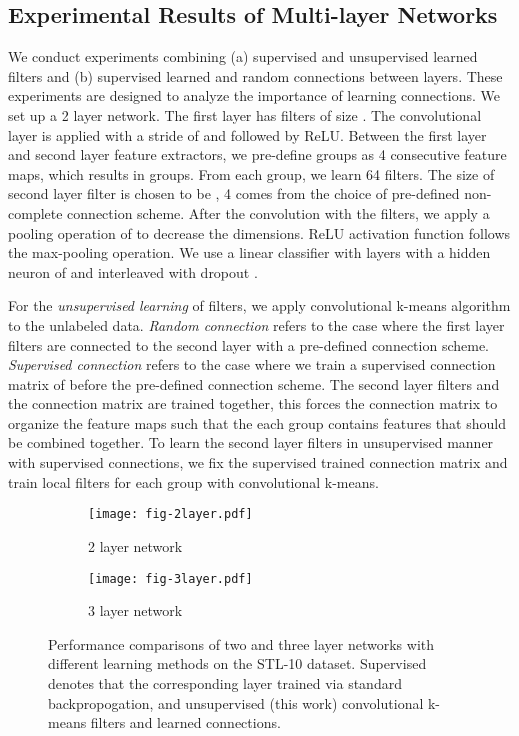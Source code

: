 \documentclass{article} \usepackage{iclr2016_workshop,times}
\begin{document}
\subsection{Experimental Results of Multi-layer Networks}\label{sec:multilayers}




We conduct experiments combining (a) supervised and unsupervised learned filters and (b) supervised learned and random connections between layers. These experiments are designed to analyze the importance of learning connections. We set up a 2 layer network. The first layer has  filters of size .
The convolutional layer is applied with a stride of  and followed by ReLU.
Between the first layer and second layer feature extractors, we pre-define groups as 4 consecutive feature maps, which results in   groups.
From each group, we learn 64 filters. The size of second layer filter is chosen to be , 4 comes from the choice of pre-defined non-complete connection scheme.
After the convolution with the filters, we apply a pooling operation of  to  decrease the dimensions. ReLU activation function follows the max-pooling operation.
We use a linear classifier with  layers with a hidden neuron of  and interleaved with dropout \citep{hinton2012improving}.


For the \textit{unsupervised learning} of filters, we apply convolutional k-means algorithm to the unlabeled data.
\textit{Random connection} refers to the case where the first layer filters are connected to the second layer with a pre-defined connection scheme.
\textit{Supervised connection} refers to the case where  we train a supervised connection matrix of  before the pre-defined connection scheme. 
The second layer filters and the connection matrix are trained together, this forces the connection matrix to organize the feature maps such that the each group contains features that should be combined together.
To learn the second layer filters in unsupervised manner with supervised connections, we fix the supervised trained connection matrix and train local filters for each group with convolutional k-means.




\begin{figure*} \centering
  \begin{subfigure}[b]{0.5\textwidth}
    \centering
    \texttt{[image: fig-2layer.pdf]}
    \caption{ 2 layer network}
    \label{fig:2layer}
  \end{subfigure}\begin{subfigure}[b]{0.5\textwidth}
      \centering
    \texttt{[image: fig-3layer.pdf]}
    \caption{3 layer network}
    \label{fig:3layer}
  \end{subfigure}
  \caption{
    Performance comparisons of two and three layer networks with different learning methods on the STL-10 dataset.
    Supervised denotes that the corresponding layer trained via standard backpropogation, and unsupervised (this work) convolutional k-means filters and learned connections.
  }
  \label{fig:networks}
\end{figure*}
\end{document}
